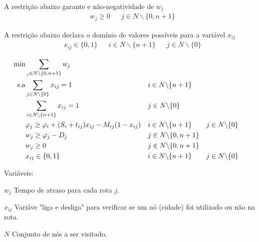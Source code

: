 \documentclass[12pt]{article}
\begin{document}
      A restrição abaixo garante e não-negatividade de $w_j$
    \begin{align}
      & w_j \geq 0                                                         & \label{eq5}    & j\in N\backslash \{0,n+1\}        
    \end{align}
    
    A restrição abaixo declara o domínio de valores possíveis para a variável $x_{ij}$
    \begin{align}
      & x_{ij} \in \{0,1\}                                                 & \label{eq6}    & i\in N\backslash \{n+1\}   &  & j\in N\backslash \{0\}       
    \end{align}
    
    \begin{align}
      \min       & \sum_{_j\in N\backslash \{0,n+1\}} w_j                             &                                                           \\
      \hbox{s.a} & \sum_{j\in N\backslash \{0\}} x_{ij} = 1                           &               & i\in N\backslash \{n+1\}                               \\
                 & \sum_{i\in N\backslash \{n+1\}} x_{ij} = 1                         &    & j\in N\backslash \{0\}                                 \\
                 & \varphi_j \geq \varphi_i + (S_i + t_{ij})x_{ij} - M_{ij}(1-x_{ij}) & \label{eq3}    & i\in N\backslash \{n+1\}   &  & j\in N\backslash \{0\} \\
                 & w_j \geq \varphi_j - D_j                                           & \label{eq4}    & j\in N\backslash \{0,n+1\}                             \\
                 & w_j \geq 0                                                         & \label{eq5}    & j\in N\backslash \{0,n+1\}                             \\
                 & x_{ij} \in \{0,1\}                                                 & \label{eq6}    & i\in N\backslash \{n+1\}   &  & j\in N\backslash \{0\}
    \end{align}
    
    
    Variáveis:
    
    $w_j$ Tempo de atraso para cada rota $j$.
    
    $x_{ij}$ Variáve "liga e desliga" para verificar se um nó (cidade) foi utilizado ou não na rota.
    
    $N$ Conjunto de nós a ser visitado.
    
\end{document}
